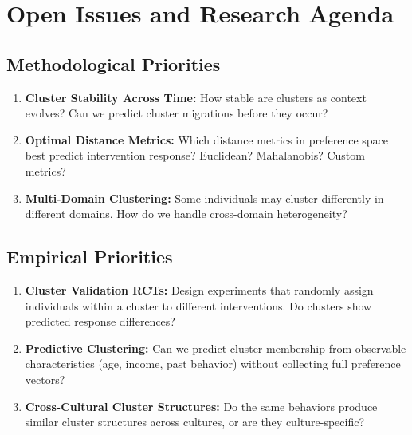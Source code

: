 \section{Open Issues and Research Agenda}
\label{sec:ba-open}

\subsection{Methodological Priorities}

\begin{enumerate}

\item \textbf{Cluster Stability Across Time:} How stable are clusters as context
evolves? Can we predict cluster migrations before they occur?

\item \textbf{Optimal Distance Metrics:} Which distance metrics in preference
space best predict intervention response? Euclidean? Mahalanobis? Custom metrics?

\item \textbf{Multi-Domain Clustering:} Some individuals may cluster differently
in different domains. How do we handle cross-domain heterogeneity?

\end{enumerate}

\subsection{Empirical Priorities}

\begin{enumerate}

\item \textbf{Cluster Validation RCTs:} Design experiments that randomly assign
individuals within a cluster to different interventions. Do clusters show
predicted response differences?

\item \textbf{Predictive Clustering:} Can we predict cluster membership from
observable characteristics (age, income, past behavior) without collecting full
preference vectors?

\item \textbf{Cross-Cultural Cluster Structures:} Do the same behaviors produce
similar cluster structures across cultures, or are they culture-specific?

\end{enumerate}

